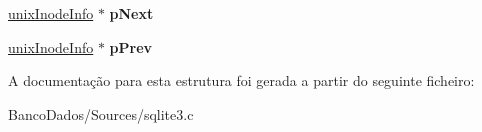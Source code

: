 \begin{DoxyCompactItemize}
\item 
\hypertarget{structunix_inode_info_a80181ba4ef71dd0d8e55e97baedc761e}{\hyperlink{structunix_inode_info}{unix\-Inode\-Info} $\ast$ {\bfseries p\-Next}}\label{structunix_inode_info_a80181ba4ef71dd0d8e55e97baedc761e}

\item 
\hypertarget{structunix_inode_info_a6575edce9898b48870c6f48047c01d01}{\hyperlink{structunix_inode_info}{unix\-Inode\-Info} $\ast$ {\bfseries p\-Prev}}\label{structunix_inode_info_a6575edce9898b48870c6f48047c01d01}

\end{DoxyCompactItemize}


A documentação para esta estrutura foi gerada a partir do seguinte ficheiro\-:\begin{DoxyCompactItemize}
\item 
Banco\-Dados/\-Sources/sqlite3.\-c\end{DoxyCompactItemize}
